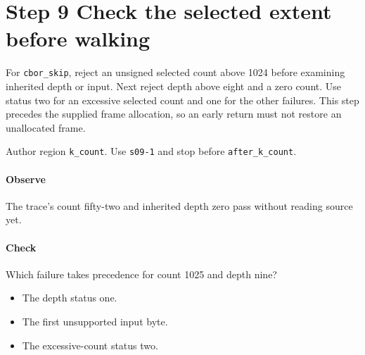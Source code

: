 \section{Step 9 Check the selected extent before walking}\label{cbor-s09}
For \texttt{cbor\_skip}, reject an unsigned selected count above 1024 before examining inherited depth or input. Next reject depth above eight and a zero count. Use status two for an excessive selected count and one for the other failures. This step precedes the supplied frame allocation, so an early return must not restore an unallocated frame.

Author region \texttt{k\_count}. Use \texttt{s09-1} and stop before \texttt{after\_k\_count}.

\paragraph{Observe} The trace's count fifty-two and inherited depth zero pass without reading source yet.

\paragraph{Check} Which failure takes precedence for count 1025 and depth nine?
\begin{itemize}
  \item[A.] The depth status one.
  \item[B.] The first unsupported input byte.
  \item[C.] The excessive-count status two.
\end{itemize}

